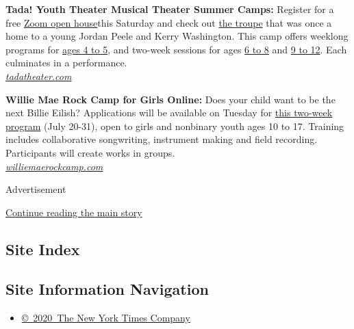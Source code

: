 \textbf{Tada! Youth Theater Musical Theater Summer Camps:} Register for
a free
\href{https://tadatheater.secure.force.com/Events/CnP_PaaS_EVT__ExternalRegistrationPage?event_id=a1g1J000007xd3YQAQ}{Zoom
open house}this Saturday and check out
\href{https://www.tadatheater.com/2020-summer-camps}{the troupe} that
was once a home to a young Jordan Peele and Kerry Washington. This camp
offers weeklong programs for
\href{https://www.tadatheater.com/2020-summer-camps-ages-4-5}{ages 4 to
5}, and two-week sessions for ages
\href{https://www.tadatheater.com/2020-summer-camps-ages-6-8}{6 to 8}
and \href{https://www.tadatheater.com/2020-summer-camps-ages-9-12}{9 to
12}. Each culminates in a performance.\\
\href{https://www.tadatheater.com/}{\emph{tadatheater.com}}

\textbf{Willie Mae Rock Camp for Girls Online:} Does your child want to
be the next Billie Eilish? Applications will be available on Tuesday for
\href{https://www.williemaerockcamp.org/}{this two-week program} (July
20-31), open to girls and nonbinary youth ages 10 to 17. Training
includes collaborative songwriting, instrument making and field
recording. Participants will create works in groups.\\
\href{https://www.williemaerockcamp.org/home}{\emph{williemaerockcamp.com}}

Advertisement

\protect\hyperlink{after-bottom}{Continue reading the main story}

\hypertarget{site-index}{%
\subsection{Site Index}\label{site-index}}

\hypertarget{site-information-navigation}{%
\subsection{Site Information
Navigation}\label{site-information-navigation}}

\begin{itemize}
\tightlist
\item
  \href{https://help.nytimes.com/hc/en-us/articles/115014792127-Copyright-notice}{©~2020~The
  New York Times Company}
\end{itemize}

